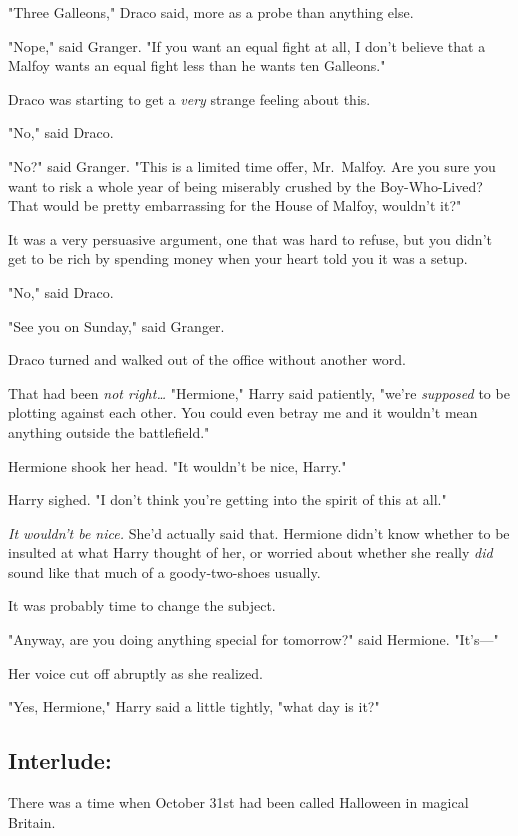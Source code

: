 "Three Galleons," Draco said, more as a probe than anything else.

"Nope," said Granger. "If you want an equal fight at all, I don't believe that 
a Malfoy wants an equal fight less than he wants ten Galleons."

Draco was starting to get a \emph{very} strange feeling about this.

"No," said Draco.

"No?" said Granger. "This is a limited time offer, Mr.~Malfoy. Are you sure you 
want to risk a whole year of being miserably crushed by the Boy-Who-Lived? That 
would be pretty embarrassing for the House of Malfoy, wouldn't it?"

It was a very persuasive argument, one that was hard to refuse, but you didn't 
get to be rich by spending money when your heart told you it was a setup.

"No," said Draco.

"See you on Sunday," said Granger.

Draco turned and walked out of the office without another word.

That had been \emph{not right{\ldots}}
\sbreak
"Hermione," Harry said patiently, "we're \emph{supposed} to be plotting against 
each other. You could even betray me and it wouldn't mean anything outside the 
battlefield."

Hermione shook her head. "It wouldn't be nice, Harry."

Harry sighed. "I don't think you're getting into the spirit of this at all."

\emph{It wouldn't be nice.} She'd actually said that. Hermione didn't know 
whether to be insulted at what Harry thought of her, or worried about whether 
she really \emph{did} sound like that much of a goody-two-shoes usually.

It was probably time to change the subject.

"Anyway, are you doing anything special for tomorrow?" said Hermione. "It's---"

Her voice cut off abruptly as she realized.

"Yes, Hermione," Harry said a little tightly, "what day is it?"
\sbreak
\vspace{-2\baselineskip}
\subsection{Interlude:}

There was a time when October 31st had been called Halloween in magical Britain.

